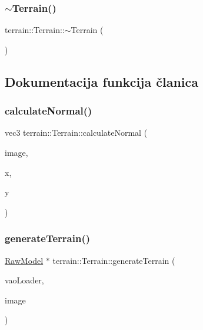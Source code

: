 \mbox{\label{classterrain_1_1Terrain_a6aa3821700c2010298c1ad9f83971670}} 
\subsubsection{\texorpdfstring{$\sim$\+Terrain()}{~Terrain()}}
{\footnotesize\ttfamily terrain\+::\+Terrain\+::$\sim$\+Terrain (\begin{DoxyParamCaption}{ }\end{DoxyParamCaption})}



\subsection{Dokumentacija funkcija članica}
\mbox{\label{classterrain_1_1Terrain_a2864540ccf7224830c0bbf2961d207bb}} 
\subsubsection{\texorpdfstring{calculate\+Normal()}{calculateNormal()}}
{\footnotesize\ttfamily vec3 terrain\+::\+Terrain\+::calculate\+Normal (\begin{DoxyParamCaption}\item[{Image}]{image,  }\item[{int}]{x,  }\item[{int}]{y }\end{DoxyParamCaption})\hspace{0.3cm}{\ttfamily [private]}}

\mbox{\label{classterrain_1_1Terrain_aadecc14ee7c1c340c54c6960d489f1da}} 
\subsubsection{\texorpdfstring{generate\+Terrain()}{generateTerrain()}}
{\footnotesize\ttfamily \hyperlink{classmodel_1_1RawModel}{Raw\+Model} $\ast$ terrain\+::\+Terrain\+::generate\+Terrain (\begin{DoxyParamCaption}\item[{\hyperlink{classcore_1_1VaoLoader}{Vao\+Loader} $\ast$}]{vao\+Loader,  }\item[{Image}]{image }\end{DoxyParamCaption})\hspace{0.3cm}{\ttfamily [private]}}


